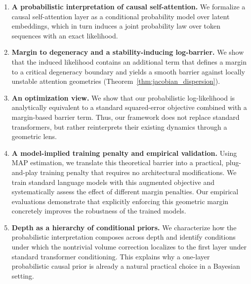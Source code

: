 \documentclass[11pt]{article}
\begin{document}
\begin{enumerate}
    \item \textbf{A probabilistic interpretation of causal self-attention.}
    We formalize a causal self-attention layer as a conditional probability model over latent embeddings, which in turn induces a joint probability law over token sequences with an exact likelihood.

    \item \textbf{Margin to degeneracy and a stability-inducing log-barrier.}
    We show that the induced likelihood contains an additional term that defines a margin to a critical degeneracy boundary and yields a smooth barrier against locally unstable attention geometries (Theorem~\ref{thm:jacobian_dispersion}).

    \item \textbf{An optimization view.}
    We show that our probabilistic log-likelihood is analytically equivalent to a standard squared-error objective combined with a margin-based barrier term. Thus, our framework does not replace standard transformers, but rather reinterprets their existing dynamics through a geometric lens.

    \item \textbf{A model-implied training penalty and empirical validation.}
    Using MAP estimation, we translate this theoretical barrier into a practical, plug-and-play training penalty that requires no architectural modifications. We train standard language models with this augmented objective and systematically assess the effect of different margin penalties. Our empirical evaluations demonstrate that explicitly enforcing this geometric margin concretely improves the robustness of the trained models.

    \item \textbf{Depth as a hierarchy of conditional priors.}
    We characterize how the probabilistic interpretation composes across depth and identify conditions under which the nontrivial volume correction localizes to the first layer under standard transformer conditioning. This explains why a one-layer probabilistic causal prior is already a natural practical choice in a Bayesian setting.
\end{enumerate}
\end{document}
